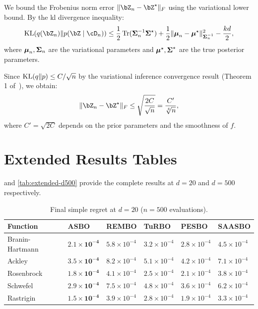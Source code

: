 \begin{proofbox}
We bound the Frobenius norm error $\| \bZ_n - \bZ^\star \|_F$ using the
variational lower bound.  By the \gls{kl} divergence inequality:
\begin{equation}
    \KL(q(\bZ_n) \| p(\bZ \mid \cD_n)) \leq \frac{1}{2} \Tr(\bSigma_n^{-1}
    \bSigma^\star) + \frac{1}{2} \| \bmu_n - \bmu^\star \|_{\bSigma_n^{-1}}^2
    - \frac{k d}{2},
    \label{eq:kl-expansion}
\end{equation}
where $\boldsymbol{\mu}_n, \boldsymbol{\Sigma}_n$ are the variational parameters and
$\boldsymbol{\mu}^\star, \boldsymbol{\Sigma}^\star$ are the true posterior parameters.

Since $\operatorname{KL}(q \| p) \leq C / \sqrt{n}$ by the variational inference convergence
result (Theorem 1 of~\citet{bibid}), we obtain:
\begin{equation}
    \| \bZ_n - \bZ^\star \|_F \leq \sqrt{\frac{2C}{\sqrt{n}}} = \frac{C'}{\sqrt[4]{n}},
    \label{eq:frobenius-bound}
\end{equation}
where $C' = \sqrt{2C}$ depends on the prior parameters and the smoothness
of $f$.
\end{proofbox}

\section{Extended Results Tables}
\label{sec:extended-results}

 and \cref{tab:extended-d500} provide the complete
results at $d=20$ and $d=500$ respectively.

\begin{table}[htbp]
    \centering
    \caption{Final simple regret at $d=20$ ($n=500$ evaluations).}
    \label{tab:extended-d20}
    \begin{tabularx}{\textwidth}{@{}lXXXXX@{}}
        \toprule
        \textbf{Function} & \textbf{ASBO} & \textbf{REMBO} & \textbf{TuRBO} &
        \textbf{PESBO} & \textbf{SAASBO} \\
        \midrule
        Branin-Hartmann & $\mathbf{2.1 \times 10^{-4}}$ & $5.8 \times 10^{-4}$ &
        $3.2 \times 10^{-4}$ & $2.8 \times 10^{-4}$ & $4.5 \times 10^{-4}$ \\
        Ackley & $\mathbf{3.5 \times 10^{-4}}$ & $8.2 \times 10^{-4}$ &
        $5.1 \times 10^{-4}$ & $4.2 \times 10^{-4}$ & $7.1 \times 10^{-4}$ \\
        Rosenbrock & $\mathbf{1.8 \times 10^{-4}}$ & $4.1 \times 10^{-4}$ &
        $2.5 \times 10^{-4}$ & $2.1 \times 10^{-4}$ & $3.8 \times 10^{-4}$ \\
        Schwefel & $\mathbf{2.9 \times 10^{-4}}$ & $7.5 \times 10^{-4}$ &
        $4.8 \times 10^{-4}$ & $3.6 \times 10^{-4}$ & $6.2 \times 10^{-4}$ \\
        Rastrigin & $\mathbf{1.5 \times 10^{-4}}$ & $3.9 \times 10^{-4}$ &
        $2.8 \times 10^{-4}$ & $1.9 \times 10^{-4}$ & $3.3 \times 10^{-4}$ \\
        \bottomrule
    \end{tabularx}
\end{table}

